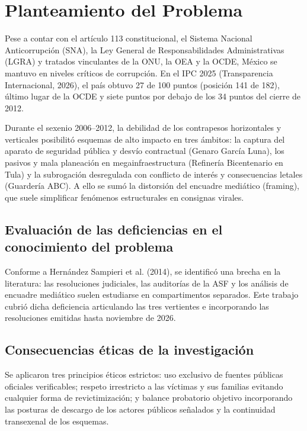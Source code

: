 \documentclass[12pt,letterpaper,oneside]{article}
\begin{document}
\clearpage


\section{Planteamiento del Problema}

Pese a contar con el artículo 113 constitucional, el Sistema Nacional Anticorrupción (SNA), la Ley General de Responsabilidades Administrativas (LGRA) y tratados vinculantes de la ONU, la OEA y la OCDE, México se mantuvo en niveles críticos de corrupción. En el IPC 2025 (Transparencia Internacional, 2026), el país obtuvo 27 de 100 puntos (posición 141 de 182), último lugar de la OCDE y siete puntos por debajo de los 34 puntos del cierre de 2012.

Durante el sexenio 2006--2012, la debilidad de los contrapesos horizontales y verticales posibilitó esquemas de alto impacto en tres ámbitos: la captura del aparato de seguridad pública y desvío contractual (Genaro García Luna), los pasivos y mala planeación en megainfraestructura (Refinería Bicentenario en Tula) y la subrogación desregulada con conflicto de interés y consecuencias letales (Guardería ABC). A ello se sumó la distorsión del encuadre mediático (framing), que suele simplificar fenómenos estructurales en consignas virales.

\subsection{Evaluación de las deficiencias en el conocimiento del problema}

Conforme a Hernández Sampieri et al. (2014), se identificó una brecha en la literatura: las resoluciones judiciales, las auditorías de la ASF y los análisis de encuadre mediático suelen estudiarse en compartimentos separados. Este trabajo cubrió dicha deficiencia articulando las tres vertientes e incorporando las resoluciones emitidas hasta noviembre de 2026.

\subsection{Consecuencias éticas de la investigación}

Se aplicaron tres principios éticos estrictos: uso exclusivo de fuentes públicas oficiales verificables; respeto irrestricto a las víctimas y sus familias evitando cualquier forma de revictimización; y balance probatorio objetivo incorporando las posturas de descargo de los actores públicos señalados y la continuidad transexenal de los esquemas.
\end{document}
